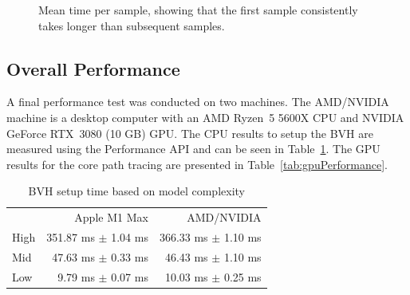 \begin{figure}
    \centering
    \caption{Mean time per sample, showing that the first sample consistently takes longer than subsequent samples.}
    \label{dia:sampling-times}
\end{figure}

\newpage
\subsection*{Overall Performance}

A final performance test was conducted on two machines. The AMD/NVIDIA machine is a desktop computer with an AMD Ryzen~5 5600X \gls{CPU} and NVIDIA GeForce RTX~3080 (10 GB) \gls{GPU}. The \gls{CPU} results to setup the \gls{BVH} are measured using the Performance \gls{API} and can be seen in Table~\ref{tab:cpuPerformance}. The \gls{GPU} results for the core path tracing are presented in Table~\ref{tab:gpuPerformance}.

\begin{table}[H]
    \centering
    \begin{tabular}{lrr}
        \toprule
             & Apple M1 Max            & AMD/NVIDIA              \\
        High & 351.87 ms $\pm$ 1.04 ms & 366.33 ms $\pm$ 1.10 ms \\
        Mid  & 47.63 ms $\pm$ 0.33 ms  & 46.43 ms $\pm$ 1.10 ms  \\
        Low  & 9.79 ms $\pm$ 0.07 ms   & 10.03 ms $\pm$ 0.25 ms  \\
        \bottomrule
    \end{tabular}
    \caption{\gls{BVH} setup time based on model complexity}
    \label{tab:cpuPerformance}
\end{table}


